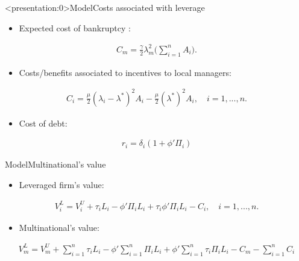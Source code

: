 \documentclass{beamer}
\begin{document}
\begin{frame}<presentation:0>{Model}{Costs associated with leverage}
\begin{itemize}
	\item  Expected cost of bankruptcy \citep{luciano2014guarantees}:
\end{itemize}
\begin{equation}
\begin{aligned}
C_m=\frac{\gamma}{2}\lambda_m^2\bigg(\sum_{i=1}^{n}A_i\bigg).
\end{aligned}
\label{eq:cost bankruptcy}
\end{equation}
\begin{itemize}
\item  Costs/benefits associated to incentives to local managers:
\end{itemize}
\begin{equation}
\begin{aligned}
C_i=\frac{\mu}{2}(\lambda_i-\lambda^*)^2A_i-\frac{\mu}{2}(\lambda^*)^2A_i, \quad i=1,...,n.
\end{aligned}
\label{eq:agency cost}
\end{equation}
\begin{itemize}
	\item  Cost of debt:
\end{itemize}
\begin{equation}
\begin{aligned}
r_i=\delta_i(1+\phi'\Pi_i)
\end{aligned}
\label{eq:cost of debt}
\end{equation}

\end{frame}

\begin{frame}{Model}{Multinational's value}

\begin{itemize}
	\item Leveraged firm's value:
\end{itemize}
\begin{equation}
\begin{aligned}
V_i^L=V_i^U+\tau_{i}L_i-\phi'\Pi_iL_i+\tau_{i}\phi'\Pi_iL_i-C_i,  \quad i=1,...,n.
\end{aligned}
\label{eq:v_l_2}
\end{equation}	
\begin{itemize}
	\item Multinational's value:
\end{itemize}
\begin{equation}
\begin{aligned}
V_m^L=V_m^U+\sum_{i=1}^{n}\tau_iL_i-\phi'\sum_{i=1}^{n}\Pi_iL_i+\phi'\sum_{i=1}^{n}\tau_i\Pi_i L_i-C_m-\sum_{i=1}^{n}C_i
\end{aligned}
\label{eq:v_l}
\end{equation}
\end{frame}
\end{document}
